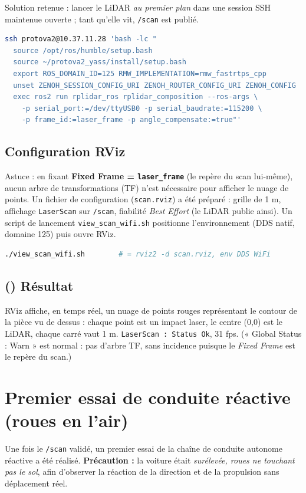 \documentclass[a4paper,11pt]{article}
\newcommand{\ok}{\textcolor{success}{\checkmark}}
\begin{document}
\noindent Solution retenue : lancer le LiDAR \emph{au premier plan} dans une
session SSH maintenue ouverte ; tant qu'elle vit, \texttt{/scan} est publié.
\begin{lstlisting}[language=bash]
ssh protova2@10.37.11.28 'bash -lc "
  source /opt/ros/humble/setup.bash
  source ~/protova2_yass/install/setup.bash
  export ROS_DOMAIN_ID=125 RMW_IMPLEMENTATION=rmw_fastrtps_cpp
  unset ZENOH_SESSION_CONFIG_URI ZENOH_ROUTER_CONFIG_URI ZENOH_CONFIG
  exec ros2 run rplidar_ros rplidar_composition --ros-args \
    -p serial_port:=/dev/ttyUSB0 -p serial_baudrate:=115200 \
    -p frame_id:=laser_frame -p angle_compensate:=true"'
\end{lstlisting}

\subsection{Configuration RViz}
Astuce : en fixant \textbf{Fixed Frame = \texttt{laser\_frame}} (le repère du
scan lui-même), aucun arbre de transformations (TF) n'est nécessaire pour
afficher le nuage de points. Un fichier de configuration
(\texttt{scan.rviz}) a été préparé : grille de 1 m, affichage \texttt{LaserScan}
sur \texttt{/scan}, fiabilité \emph{Best Effort} (le LiDAR publie ainsi). Un
script de lancement \texttt{view\_scan\_wifi.sh} positionne l'environnement
(DDS natif, domaine 125) puis ouvre RViz.
\begin{lstlisting}[language=bash]
./view_scan_wifi.sh        # = rviz2 -d scan.rviz, env DDS WiFi
\end{lstlisting}

\subsection{(\ok) Résultat}
RViz affiche, en temps réel, un nuage de points rouges représentant le contour
de la pièce vu de dessus : chaque point est un impact laser, le centre (0,0) est
le LiDAR, chaque carré vaut 1 m. \texttt{LaserScan : Status Ok}, 31 fps.
(« Global Status : Warn » est normal : pas d'arbre TF, sans incidence puisque le
\emph{Fixed Frame} est le repère du scan.)

\section{Premier essai de conduite réactive (roues en l'air)}
Une fois le \texttt{/scan} validé, un premier essai de la chaîne de conduite
autonome réactive a été réalisé. \textbf{Précaution :} la voiture était
\emph{surélevée, roues ne touchant pas le sol}, afin d'observer la réaction de la
direction et de la propulsion sans déplacement réel.
\end{document}
